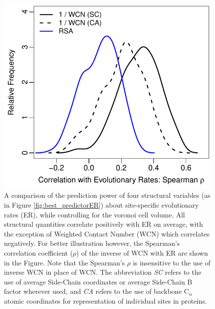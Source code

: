 \documentclass[11pt]{article}
\begin{document}
    \begin{figure}
        \begin{center}
        \includegraphics[width=5.5in]{best_structural_predictors_of_ER_given_vol.pdf}
        \end{center}
        \caption{A comparison of the prediction power of four structural variables (as in Figure \ref{fig:best_predictorER}) about site-specific evolutionary rates (ER), while controlling for the voronoi cell volume. All structural quantities correlate positively with ER on average, with the exception of Weighted Contact Number (WCN) which correlates negatively. For better illustration however, the Spearman's correlation coefficient ($\rho$) of the inverse of WCN with ER are shown in the Figure. Note that the Spearman's $\rho$ is insensitive to the use of inverse WCN in place of WCN. The abbreviation {\it SC} refers to the use of average Side-Chain coordinates or average Side-Chain B factor wherever used, and {\it CA} refers to the use of backbone C$_\alpha$ atomic coordinates for representation of individual sites in proteins.}
        \label{fig:best_predictorER_given_volume}
    \end{figure}
\end{document}
